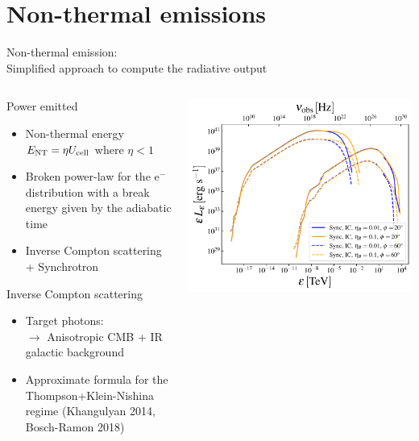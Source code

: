 \section{Non-thermal emissions}

\begin{frame}{Non-thermal emission:\\
	Simplified approach to compute the radiative output}
	\begin{columns}
		{\scriptsize
		\begin{column}{.5\textwidth}
			\begin{block}{Power emitted}
				\begin{itemize}
					\item Non-thermal energy $E_{\rm NT} = \eta U_{\rm cell}$ where $\eta<1$
					\item Broken power-law for the e$^{-}$ distribution with a break 
							energy given by the adiabatic time  \\
					\item Inverse Compton scattering + Synchrotron
				\end{itemize}
			\end{block}
			\begin{block}{Inverse Compton scattering}
			    \begin{itemize}
				    \item Target photons:\\
						$\rightarrow$ Anisotropic CMB + IR galactic background
					\item Approximate formula for the Thompson+Klein-Nishina regime
						(Khangulyan 2014, Bosch-Ramon 2018)
				\end{itemize}
			\end{block}
		\end{column}
		\begin{column}{.5\textwidth}
			\includegraphics[width=\linewidth]{images/eled_hr.pdf}

\end{column}}
\end{columns}
\end{frame}
